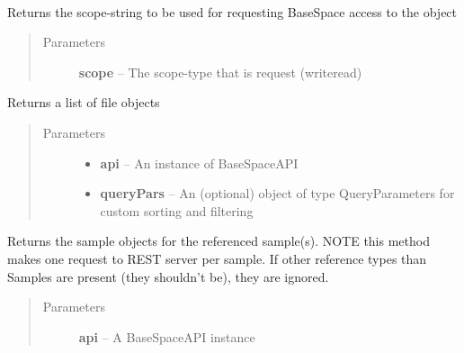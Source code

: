 \documentclass[letterpaper,10pt,english]{sphinxmanual}
\begin{document}
\begin{fulllineitems}
\label{Available modules:BaseSpacePy.model.AppResult.AppResult}~

\begin{fulllineitems}
\label{Available modules:BaseSpacePy.model.AppResult.AppResult.getAccessStr}
Returns the scope-string to be used for requesting BaseSpace access to the object
\begin{quote}\begin{description}
\item[{Parameters}] \leavevmode
\textbf{scope} -- The scope-type that is request (write\textbar{}read)

\end{description}\end{quote}

\end{fulllineitems}


\begin{fulllineitems}
\label{Available modules:BaseSpacePy.model.AppResult.AppResult.getFiles}
Returns a list of file objects
\begin{quote}\begin{description}
\item[{Parameters}] \leavevmode\begin{itemize}
\item {} 
\textbf{api} -- An instance of BaseSpaceAPI

\item {} 
\textbf{queryPars} -- An (optional) object of type QueryParameters for custom sorting and filtering

\end{itemize}

\end{description}\end{quote}

\end{fulllineitems}


\begin{fulllineitems}
\label{Available modules:BaseSpacePy.model.AppResult.AppResult.getReferencedSamples}
Returns the sample objects for the referenced sample(s). 
NOTE this method makes one request to REST server per sample.
If other reference types than Samples are present (they shouldn't be), they are ignored.
\begin{quote}\begin{description}
\item[{Parameters}] \leavevmode
\textbf{api} -- A BaseSpaceAPI instance


\end{description}
\end{quote}
\end{fulllineitems}
\end{fulllineitems}
\end{document}
